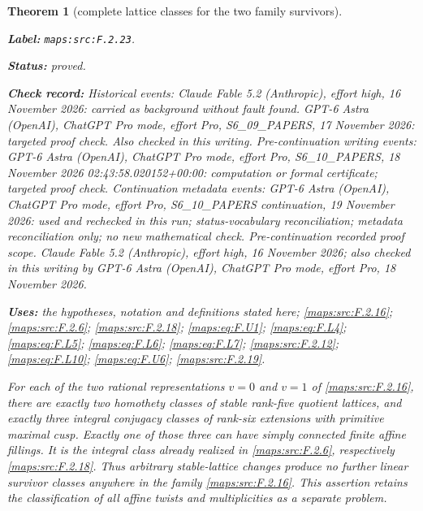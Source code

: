 \documentclass[11pt,a4paper]{article}
\newtheorem{theorem}{Theorem}[section]
\theoremstyle{definition}
\newcommand{\StatementRecord}[4]{\par\smallskip\begingroup\upshape\raggedright\noindent\textbf{Label:} \nolinkurl{#1}.\par\noindent\textbf{Status:} #2.\par\noindent\textbf{Check record:} #3.\par\noindent\textbf{Uses:} #4.\par\endgroup\smallskip}
\begin{document}
\begin{theorem}[complete lattice classes for the two family survivors]\label{maps:src:F.2.23}
\StatementRecord{maps:src:F.2.23}{proved}{Historical events: Claude Fable 5.2 (Anthropic), effort high, 16 November 2026: carried as background without fault found. GPT-6 Astra (OpenAI), ChatGPT Pro mode, effort Pro, S6\_09\_PAPERS, 17 November 2026: targeted proof check. Also checked in this writing. Pre-continuation writing events: GPT-6 Astra (OpenAI), ChatGPT Pro mode, effort Pro, S6\_10\_PAPERS, 18 November 2026 02:43:58.020152+00:00: computation or formal certificate; targeted proof check. Continuation metadata events: GPT-6 Astra (OpenAI), ChatGPT Pro mode, effort Pro, S6\_10\_PAPERS continuation, 19 November 2026: used and rechecked in this run; status-vocabulary reconciliation; metadata reconciliation only; no new mathematical check. \emph{Pre-continuation recorded proof scope.} Claude Fable 5.2 (Anthropic), effort high, 16 November 2026; also checked in this writing by GPT-6 Astra (OpenAI), ChatGPT Pro mode, effort Pro, 18 November 2026}{the hypotheses, notation and definitions stated here; \cref{maps:src:F.2.16}; \cref{maps:src:F.2.6}; \cref{maps:src:F.2.18}; \cref{maps:eq:F.U1}; \cref{maps:eq:F.L4}; \cref{maps:eq:F.L5}; \cref{maps:eq:F.L6}; \cref{maps:eq:F.L7}; \cref{maps:src:F.2.12}; \cref{maps:eq:F.L10}; \cref{maps:eq:F.U6}; \cref{maps:src:F.2.19}}


For each of the two rational representations $v=0$ and $v=1$
of \ref{maps:src:F.2.16}, there are exactly two homothety classes of stable
rank-five quotient lattices, and exactly three integral
conjugacy classes of rank-six extensions with primitive
maximal cusp.  Exactly one of those three can have simply
connected finite affine fillings.  It is the integral class
already realized in \ref{maps:src:F.2.6}, respectively \ref{maps:src:F.2.18}.
Thus arbitrary stable-lattice changes produce no further
linear survivor classes anywhere in the family \ref{maps:src:F.2.16}.
This assertion retains the classification of all affine
twists and multiplicities as a separate problem.

\end{theorem}
\end{document}
